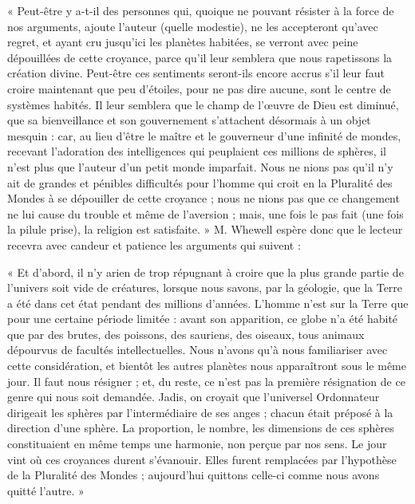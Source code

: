 \documentclass[a4paper, 11pt, oneside]{article}
\begin{document}
« Peut-être y a-t-il des personnes qui, quoique ne pouvant résister à la force de nos arguments, ajoute l'auteur (quelle modestie), ne les accepteront qu'avec regret, et ayant cru jusqu'ici les planètes habitées, se verront avec peine dépouillées de cette croyance, parce qu'il leur semblera que nous rapetissons la création divine. Peut-être ces sentiments seront-ils encore accrus s'il leur faut croire maintenant que peu d'étoiles, pour ne pas dire aucune, sont le centre de systèmes habités. Il leur semblera que le champ de l'œuvre de Dieu est diminué, que sa bienveillance et son gouvernement s'attachent désormais à un objet mesquin : car, au lieu d'être le maître et le gouverneur d'une infinité de mondes, recevant l'adoration des intelligences qui peuplaient ces millions de sphères, il n'est plus que l'auteur d'un petit monde imparfait. Nous ne nions pas qu'il n'y ait de grandes et pénibles difficultés pour l'homme qui croit en la Pluralité des Mondes à se dépouiller de cette croyance ; nous ne nions pas que ce changement ne lui cause du trouble et même de l'aversion ; mais, une fois le pas fait (une fois la pilule prise), la religion est satisfaite. » M. Whewell espère donc que le lecteur recevra avec candeur et patience les arguments qui suivent :

« Et d'abord, il n'y arien de trop répugnant à croire que la plus grande partie de l'univers soit vide de créatures, lorsque nous savons, par la géologie, que la Terre a été dans cet état pendant des millions d'années. L'homme n'est sur la Terre que pour une certaine période limitée : avant son apparition, ce globe n'a été habité que par des brutes, des poissons, des sauriens, des oiseaux, tous animaux dépourvus de facultés intellectuelles. Nous n'avons qu'à nous familiariser avec cette considération, et bientôt les autres planètes nous apparaîtront sous le même jour. Il faut nous résigner ; et, du reste, ce n'est pas la première résignation de ce genre qui nous soit demandée. Jadis, on croyait que l'universel Ordonnateur dirigeait les sphères par l'intermédiaire de ses anges ; chacun était préposé à la direction d'une sphère. La proportion, le nombre, les dimensions de ces sphères constituaient en même temps une harmonie, non perçue par nos sens. Le jour vint où ces croyances durent s'évanouir. Elles furent remplacées par l'hypothèse de la Pluralité des Mondes ; aujourd'hui quittons celle-ci comme nous avons quitté l'autre. »
\end{document}
